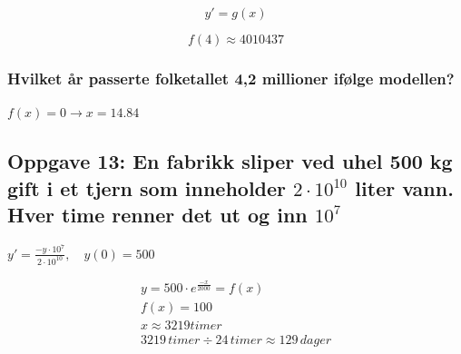 \documentclass{article}
\begin{document}

$$y' = g(x)$$


$$f(4)\approx4010437$$

\subsubsection{Hvilket år passerte folketallet 4,2 millioner ifølge modellen?}

$f(x)=0 \rightarrow x=14.84$


\subsection{Oppgave 13: En fabrikk sliper ved uhel 500 kg gift i et tjern som inneholder $2\cdot 10^10$ liter vann. Hver time renner det ut og inn $10^7$}

 $y'= \frac{-y \cdot 10^7}{2 \cdot 10^{10}}, \quad y(0) = 500$


\begin{align*}
    y = 500 \cdot e^{\frac{-x}{2000}} = f(x) \\
    f(x) = 100 \\
    x \approx 3219 timer \\
    3219 \, timer \div 24 \, timer \approx 129 \, dager
\end{align*}




\end{document}
